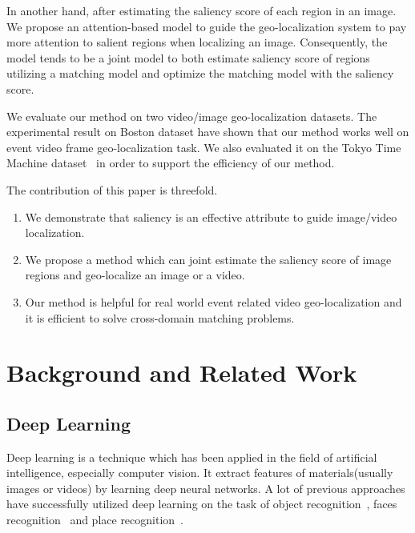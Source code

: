 \par
In another hand, after estimating the saliency score of each region in an image. We propose an attention-based model to guide the geo-localization system to pay more attention to salient regions when localizing an image. Consequently, the model tends to be a joint model to both estimate saliency score of regions utilizing a matching model and optimize the matching model with the saliency score. 
\par
We evaluate our method on two video/image geo-localization datasets. The experimental result on Boston dataset have shown that our method works well on event video frame geo-localization task. We also evaluated it on the Tokyo Time Machine dataset~\cite{Arandjelovic16} in order to support the efficiency of our method.
\par
The contribution of this paper is threefold. 
\begin{enumerate}
\item We demonstrate that saliency is an effective attribute to guide image/video localization. 
\item We propose a method which can joint estimate the saliency score of image regions and geo-localize an image or a video.
\item Our method is helpful for real world event related video geo-localization and it is efficient to solve cross-domain matching problems.
\end{enumerate}



\section{Background and Related Work}
\subsection{Deep Learning}
\par
Deep learning is a technique which has been applied in the field of artificial intelligence, especially computer vision. It extract features of materials(usually images or videos) by learning deep neural networks. A lot of previous approaches have successfully utilized deep learning on the task of object recognition~\cite{krizhevsky2012imagenet}, faces recognition~\cite{taigman2014deepface} and place recognition~\cite{zhou2014learning,lin2015learning,Arandjelovic16,workman2015wide,weyand2016planet}. 

